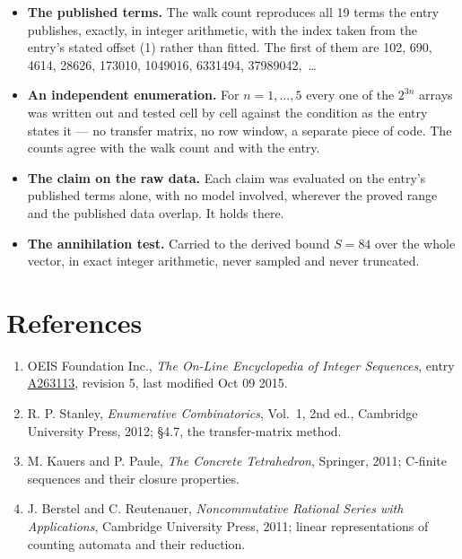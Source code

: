 \documentclass[11pt]{article}
\theoremstyle{definition}
\begin{document}
\begin{itemize}

\item {\bfseries The published terms.} The walk count reproduces all 19 terms the entry publishes, exactly, in integer arithmetic, with the index taken from the entry's stated offset (1) rather than fitted. The first of them are 102, 690, 4614, 28626, 173010, 1049016, 6331494, 37989042,~\dots

\item {\bfseries An independent enumeration.} For $n = 1,\dots,5$ every one of the $2^{3n}$ arrays was written out and tested cell by cell against the condition as the entry states it --- no transfer matrix, no row window, a separate piece of code. The counts agree with the walk count and with the entry.

\item {\bfseries The claim on the raw data.} Each claim was evaluated on the entry's published terms alone, with no model involved, wherever the proved range and the published data overlap. It holds there.

\item {\bfseries The annihilation test.} Carried to the derived bound $S = 84$ over the whole vector, in exact integer arithmetic, never sampled and never truncated.

\end{itemize}

\section{References}

\begin{enumerate}

\item OEIS Foundation Inc., \emph{The On-Line Encyclopedia of Integer Sequences}, entry \href{https://oeis.org/A263113}{A263113}, revision 5, last modified Oct 09 2015.

\item R. P. Stanley, \emph{Enumerative Combinatorics}, Vol.~1, 2nd ed., Cambridge University Press, 2012; \S4.7, the transfer-matrix method.

\item M. Kauers and P. Paule, \emph{The Concrete Tetrahedron}, Springer, 2011; C-finite sequences and their closure properties.

\item J. Berstel and C. Reutenauer, \emph{Noncommutative Rational Series with Applications}, Cambridge University Press, 2011; linear representations of counting automata and their reduction.

\end{enumerate}
\end{document}
